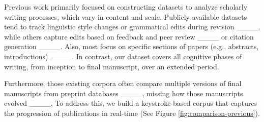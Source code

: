 Previous work primarily focused on constructing datasets to analyze scholarly writing processes, which vary in content and scale. Publicly available datasets tend to track linguistic style changes or grammatical edits during revision ____, while others capture edits based on feedback and peer review ____ or citation generation ____. Also, most focus on specific sections of papers (e.g., abstracts, introductions) ____. In contrast, our dataset covers all cognitive phases of writing, from inception to final manuscript, over an extended period.

Furthermore, those existing corpora often compare multiple versions of final manuscripts from preprint databases ____, missing how those manuscripts evolved ____. To address this, we build a keystroke-based corpus that captures the progression of publications in real-time (See Figure \ref{fig:comparison-previous}).





